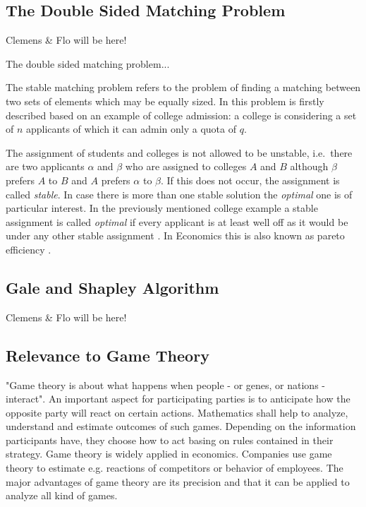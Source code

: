 \subsection{The Double Sided Matching Problem}
Clemens \& Flo will be here!

The double sided matching problem...

The stable matching problem refers to the problem of finding a matching between two sets of elements which may be equally sized. In \cite[p. 9]{gale62a} this problem is firstly described based on an example of college admission: a college is considering a set of $n$ applicants of which it can admin only a quota of $q$.

The assignment of students and colleges is not allowed to be unstable, i.e.\ there are two applicants $\alpha$ and $\beta$ who are assigned to colleges $A$ and $B$ although $\beta$ prefers $A$ to $B$ and $A$ prefers $\alpha$ to $\beta$. If this does not occur, the assignment is called \textit{stable}. In case there is more than one stable solution the \textit{optimal} one is of particular interest. In the previously mentioned college example a stable assignment is called \textit{optimal} if every applicant is at least well off as it would be under any other stable assignment \cite[p. 10]{gale62a}. In Economics this is also known as pareto efficiency \cite[p. 46]{9780199297818}.

\subsection{Gale and Shapley Algorithm}
Clemens \& Flo will be here!

\subsection{Relevance to Game Theory}
"Game theory is about what happens when people - or genes, or nations - interact". An important aspect for participating parties is to anticipate how the opposite party will react on certain actions. Mathematics shall help to analyze, understand and estimate outcomes of such games. Depending on the information participants have, they choose how to act basing on rules contained in their strategy. Game theory is widely applied in economics. Companies use game theory to estimate e.g. reactions of competitors or behavior of employees. The major advantages of game theory are its precision and that it can be applied to analyze all kind of games. \cite[p. 1 ff.]{camerer2003behavioral}
